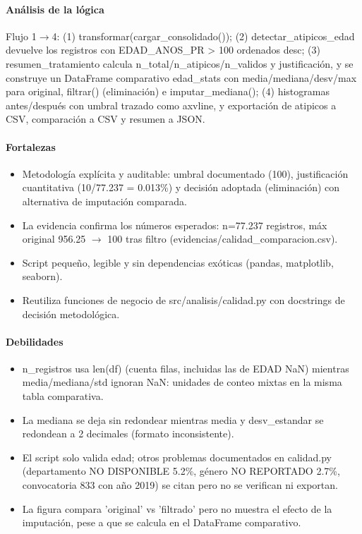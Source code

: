 \paragraph{Análisis de la lógica}
Flujo 1$\rightarrow$4: (1) transformar(cargar\_consolidado()); (2) detectar\_atipicos\_edad devuelve los registros con EDAD\_ANOS\_PR > 100 ordenados desc; (3) resumen\_tratamiento calcula n\_total/n\_atipicos/n\_validos y justificación, y se construye un DataFrame comparativo edad\_stats con media/mediana/desv/max para original, filtrar() (eliminación) e imputar\_mediana(); (4) histogramas antes/después con umbral trazado como axvline, y exportación de atipicos a CSV, comparación a CSV y resumen a JSON.

\paragraph{Fortalezas}
\begin{itemize}
  \item Metodología explícita y auditable: umbral documentado (100), justificación cuantitativa (10/77.237 = 0.013\%) y decisión adoptada (eliminación) con alternativa de imputación comparada.
  \item La evidencia confirma los números esperados: n=77.237 registros, máx original 956.25 $\rightarrow$ 100 tras filtro (evidencias/calidad\_comparacion.csv).
  \item Script pequeño, legible y sin dependencias exóticas (pandas, matplotlib, seaborn).
  \item Reutiliza funciones de negocio de src/analisis/calidad.py con docstrings de decisión metodológica.
\end{itemize}

\paragraph{Debilidades}
\begin{itemize}
  \item n\_registros usa len(df) (cuenta filas, incluidas las de EDAD NaN) mientras media/mediana/std ignoran NaN: unidades de conteo mixtas en la misma tabla comparativa.
  \item La mediana se deja sin redondear mientras media y desv\_estandar se redondean a 2 decimales (formato inconsistente).
  \item El script solo valida edad; otros problemas documentados en calidad.py (departamento NO DISPONIBLE 5.2\%, género NO REPORTADO 2.7\%, convocatoria 833 con año 2019) se citan pero no se verifican ni exportan.
  \item La figura compara 'original' vs 'filtrado' pero no muestra el efecto de la imputación, pese a que se calcula en el DataFrame comparativo.
\end{itemize}

